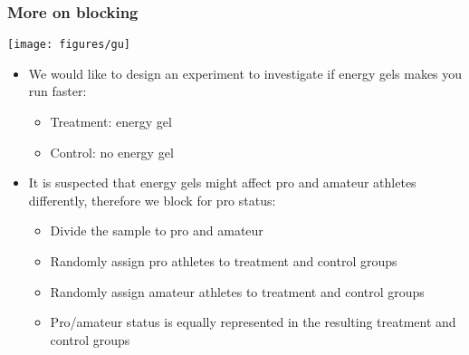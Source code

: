 \begin{frame}
\frametitle{More on blocking}


{
\begin{center}
\texttt{[image: figures/gu]}
\end{center}
}
{
\begin{itemize}
\item We would like to design an experiment to investigate if energy gels makes you run faster:

\pause

\begin{itemize}
\item Treatment: energy gel
\item Control: no energy gel
\end{itemize}

\pause

\item It is suspected that energy gels might affect pro and amateur athletes differently, therefore we block for pro status:

\pause

\begin{itemize}
\item Divide the sample to pro and amateur
\item Randomly assign pro athletes to treatment and control groups
\item Randomly assign amateur athletes to treatment and control groups
\item Pro/amateur status is equally represented in the resulting treatment and control groups
\end{itemize}
\end{itemize}
}

\pause


\end{frame}


